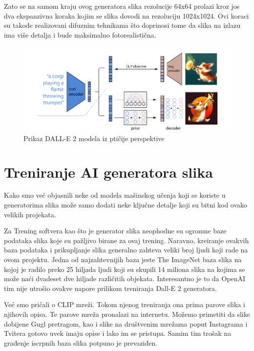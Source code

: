 \documentclass[12pt, letterpaper]{article}
\begin{document}
Zato se na samom kraju ovog generatora slika rezolucije 64x64 prolazi kroz jos dva ekspanzivna koraka kojim se slika dovodi na rezoluciju 1024x1024. Ovi koraci su takođe realizovani difuznim tehnikama što doprinosi tome da slika na izlazu ima više detalja i bude maksimalno fotorealistična.\cite{openai_dali}

\begin{figure}[htp]
\centering
\includegraphics[width=1\textwidth]{dalle2.png}
\caption{Prikaz DALL-E 2 modela iz ptičije perspektive}
\label{fig: dalle2slika}
\end{figure}

\pagebreak

\section{Treniranje AI generatora slika}

Kako smo već objasnili neke od modela mašinskog učenja koji se koriste u generatorima slika može samo dodati neke ključne detalje koji su bitni kod ovako velikih projekata.

Za Trening softvera kao što je generator slika neophodne su ogromne baze podataka slika koje su pažljivo birane za ovaj trening. Naravno, kreiranje ovakvih baza podataka i prikupljanje slika generalno zahteva veliki broj ljudi koji rade na ovom projektu. Jedna od najzahtevnijih baza jeste The ImageNet baza slika na kojoj je radilo preko 25 hiljada ljudi koji su skupili 14 miliona slika na kojima se može naći dvadeset dve hiljade različitih objekata. Interesantno je to da OpenAI tim nije utrošio ovakve napore prilikom treniranja Dall-E 2 generatora. \cite{clip}

Već smo pričali o CLIP mreži. Tokom njenog treniranja ona prima parove slika i njihovih opisa. Te parove mreža pronalazi na internetu. Možemo primetiti da slike dobijene Gugl pretragom, kao i slike na društvenim mrežama poput Instagrama i Tvitera gotovo uvek imaju opise i lako im se pristupa. Samim tim trošak na građenje iscrpnih baza slika potpuno je prevaziđen.\cite{clip, openai_dali}
\end{document}
